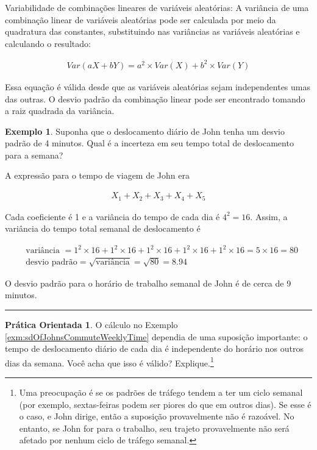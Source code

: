 \documentclass[
]{book}
\theoremstyle{definition}
\theoremstyle{definition}
\newtheorem{example}{Exemplo}[chapter]
\theoremstyle{definition}
\newtheorem{exercise}{Prática Orientada}[chapter]
\theoremstyle{definition}
\theoremstyle{remark}
\begin{document}
Variabilidade de combinações lineares de variáveis aleatórias: A variância de uma combinação linear de variáveis aleatórias pode ser calculada por meio da quadratura das constantes, substituindo nas variâncias as variáveis aleatórias e calculando o resultado:

\begin{align*}
Var(aX + bY) = a^2\times Var(X) + b^2\times Var(Y)
\end{align*}

Essa equação é válida desde que as variáveis aleatórias sejam independentes umas das outras. O desvio padrão da combinação linear pode ser encontrado tomando a raiz quadrada da variância.

\begin{example}
\protect\hypertarget{exm:sdOfJohnsCommuteWeeklyTime}{}{\label{exm:sdOfJohnsCommuteWeeklyTime} }Suponha que o deslocamento diário de John tenha um desvio padrão de 4 minutos. Qual é a incerteza em seu tempo total de deslocamento para a semana?
\end{example}

A expressão para o tempo de viagem de John era

\begin{align*}
X_1 + X_2 + X_3 + X_4 + X_5
\end{align*}

Cada coeficiente é 1 e a variância do tempo de cada dia é \(4^2=16\). Assim, a variância do tempo total semanal de deslocamento é

\begin{align*}
&\text{variância }= 1^2 \times  16 + 1^2 \times  16 + 1^2 \times  16 + 1^2 \times  16 + 1^2 \times  16 = 5\times 16 = 80 \\
&\text{desvio padrão} = \sqrt{\text{variância}} = \sqrt{80} = 8.94
\end{align*}

O desvio padrão para o horário de trabalho semanal de John é de cerca de 9 minutos.

\begin{center}\rule{0.5\linewidth}{0.5pt}\end{center}

\begin{exercise}
\protect\hypertarget{exr:unnamed-chunk-81}{}{\label{exr:unnamed-chunk-81} }O cálculo no Exemplo \ref{exm:sdOfJohnsCommuteWeeklyTime} dependia de uma suposição importante: o tempo de deslocamento diário de cada dia é independente do horário nos outros dias da semana. Você acha que isso é válido? Explique.\footnote{Uma preocupação é se os padrões de tráfego tendem a ter um ciclo semanal (por exemplo, sextas-feiras podem ser piores do que em outros dias). Se esse é o caso, e John dirige, então a suposição provavelmente não é razoável. No entanto, se John for para o trabalho, seu trajeto provavelmente não será afetado por nenhum ciclo de tráfego semanal.}
\end{exercise}
\end{document}
